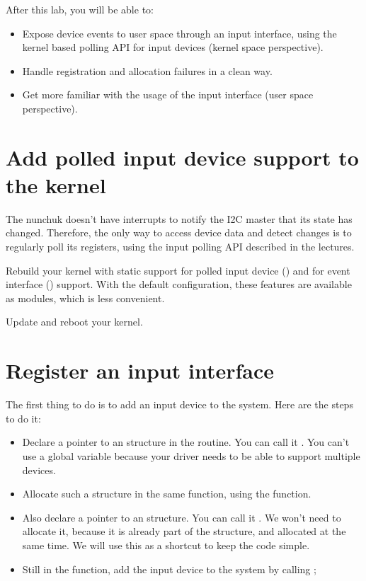 
After this lab, you will be able to:

\begin{itemize}
\item Expose device events to user space through an input interface,
      using the kernel based polling API for input devices
      (kernel space perspective).
\item Handle registration and allocation failures in a clean
      way.
\item Get more familiar with the usage of the input interface
      (user space perspective).
\end{itemize}

\section{Add polled input device support to the kernel}

The nunchuk doesn't have interrupts to notify the I2C master that
its state has changed. Therefore, the only way to access device data
and detect changes is to regularly poll its registers, using the input
polling API described in the lectures.

Rebuild your kernel with static support for polled input device
() and for event interface
() support. With the default configuration,
these features are available as modules, which is less convenient.

Update and reboot your kernel.

\section{Register an input interface}

The first thing to do is to add an input device to the system. Here are
the steps to do it:

\begin{itemize}
\item Declare a pointer to an  structure in the
       routine. You can call it .
      You can't use a global variable because your driver needs to be
      able to support multiple devices.
\item Allocate such a structure in the same function, using the
       function.
\item Also declare a pointer to an  structure. You can
      call it . We won't need to allocate it, because it
      is already part of the  structure,
      and allocated at the same time.
      We will use this as a shortcut to keep the code simple.
\item Still in the  function, add the input device to
      the system by calling ;
\end{itemize}

